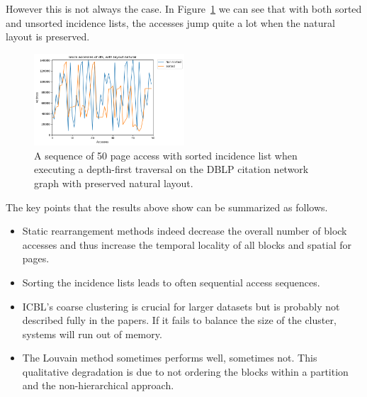     However this is not always the case. In Figure~\ref{dblp_ng} we can see that with both sorted and unsorted incidence lists, the accesses jump quite a lot when the natural layout is preserved.
    \begin{figure}[htp]
        \begin{center}
            \includegraphics[keepaspectratio,width=0.5\textwidth]{img/07-eval/dblp_natural_dfs_block_sil_access_seq.png}
        \end{center}
        \caption{A sequence of 50 page access with sorted incidence list when executing a depth-first traversal on the DBLP citation network graph with preserved natural layout.} 
        \label{dblp_ng}
    \end{figure}
    
     The key points that the results above show can be summarized as follows.
    \begin{itemize}
     \item Static rearrangement methods indeed decrease the overall number of block accesses and thus increase the temporal locality of all blocks and spatial for pages.
     \item Sorting the incidence lists leads to often sequential access sequences.
     \item ICBL's coarse clustering is crucial for larger datasets but is probably not described fully in the papers.
     If it fails to balance the size of the cluster, systems will run out of memory.
     \item The Louvain method sometimes performs well, sometimes not. This qualitative degradation is due to not ordering the blocks within a partition and the non-hierarchical approach.
    \end{itemize}
